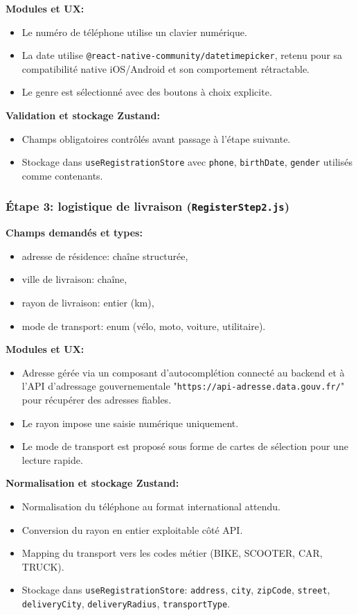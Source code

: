 \textbf{Modules et UX:}
\begin{itemize}
    \item Le numéro de téléphone utilise un clavier numérique.
    \item La date utilise \texttt{@react-native-community/datetimepicker}, retenu pour sa compatibilité native iOS/Android et son comportement rétractable.
    \item Le genre est sélectionné avec des boutons à choix explicite.
\end{itemize}

\textbf{Validation et stockage Zustand:}
\begin{itemize}
    \item Champs obligatoires contrôlés avant passage à l'étape suivante.
    \item Stockage dans \texttt{useRegistrationStore} avec \texttt{phone}, \texttt{birthDate}, \texttt{gender} utilisés comme contenants.
\end{itemize}

\subsubsection{Étape 3: logistique de livraison (\texttt{RegisterStep2.js})}

\textbf{Champs demandés et types:}
\begin{itemize}
    \item adresse de résidence: chaîne structurée,
    \item ville de livraison: chaîne,
    \item rayon de livraison: entier (km),
    \item mode de transport: enum (vélo, moto, voiture, utilitaire).
\end{itemize}

\textbf{Modules et UX:}
\begin{itemize}
    \item Adresse gérée via un composant d'autocomplétion connecté au backend et à l'API d'adressage gouvernementale "\texttt{https://api-adresse.data.gouv.fr/}" pour récupérer des adresses fiables.
    \item Le rayon impose une saisie numérique uniquement.
    \item Le mode de transport est proposé sous forme de cartes de sélection pour une lecture rapide.
\end{itemize}

\textbf{Normalisation et stockage Zustand:}
\begin{itemize}
    \item Normalisation du téléphone au format international attendu.
    \item Conversion du rayon en entier exploitable côté API.
    \item Mapping du transport vers les codes métier (BIKE, SCOOTER, CAR, TRUCK).
    \item Stockage dans \texttt{useRegistrationStore}: \texttt{address}, \texttt{city}, \texttt{zipCode}, \texttt{street}, \texttt{deliveryCity}, \texttt{deliveryRadius}, \texttt{transportType}.
\end{itemize}

